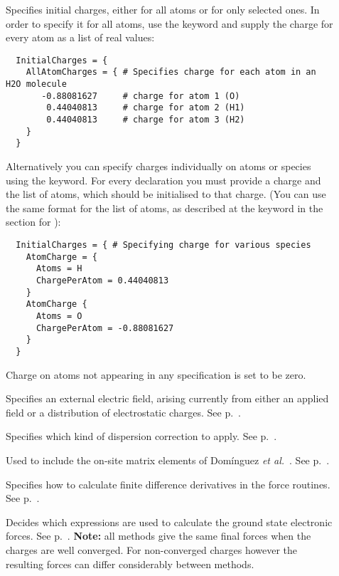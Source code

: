 \begin{description}
\item[] Specifies initial charges, either for all atoms or
  for only selected ones. In order to specify it for all atoms, use the keyword
   and supply the charge for every atom as a list of real
  values:
\begin{verbatim}
  InitialCharges = {
    AllAtomCharges = { # Specifies charge for each atom in an H2O molecule
       -0.88081627     # charge for atom 1 (O)
        0.44040813     # charge for atom 2 (H1)
        0.44040813     # charge for atom 3 (H2)
    }
  }
\end{verbatim}
  Alternatively you can specify charges individually on atoms or
  species using the  keyword. For every 
  declaration you must provide a charge and the list of atoms,
  which should be initialised to that charge. (You can use the
  same format for the list of atoms, as described at the
   keyword in the section for ):
\begin{verbatim}
  InitialCharges = { # Specifying charge for various species
    AtomCharge = {
      Atoms = H
      ChargePerAtom = 0.44040813
    }
    AtomCharge {
      Atoms = O
      ChargePerAtom = -0.88081627
    }
  }
\end{verbatim}
  Charge on atoms not appearing in any 
  specification is set to be zero.


\item[] Specifies an external electric field,
  arising currently from either an applied field or a distribution of
  electrostatic charges. See p.~.

\item[] Specifies which kind of dispersion correction
  to apply. See p.~.

\item[] Used to include the on-site matrix elements of
  Dom\'inguez {\it et al.}~\cite{dominguez15}. See p.~.
  
\item[] Specifies how to calculate finite difference
  derivatives in the force routines. See p.~.

\item[] Decides which expressions are used to calculate the ground state
  electronic forces.  See p.~. \textbf{Note:} all methods give the same final
  forces when the charges are well converged. For non-converged charges however the resulting forces
  can differ considerably between methods.


\end{description}
